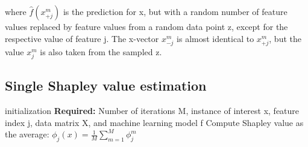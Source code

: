 where $\hat{f}(x^{m}_{+j})$ is the prediction for x, but with a random number of feature values replaced by feature values from a random data point z, except for the respective value of feature j.
The x-vector $x^{m}_{-j}$ is almost identical to $x^{m}_{+j}$, but the value $x_j^{m}$ is also taken from the sampled z.

\subsection{Single Shapley value estimation}

\begin{algorithm}[H]
\SetAlgoLined
{}
 initialization\;
 \textbf{Required: }Number of iterations M, instance of interest x, feature index j, data matrix X, and machine learning model f\linebreak\linebreak
 Compute Shapley value as the average: $\phi_j(x)=\frac{1}{M}\sum_{m=1}^M\phi_j^{m}$
 \caption{}
\end{algorithm}



